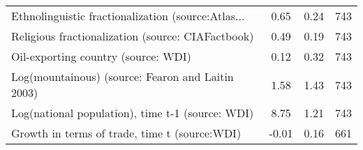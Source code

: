 \begin{table}
\begin{tabular}{lccc}
Ethnolinguistic fractionalization (source:Atlas... &    0.65 &               0.24 &          743 \\
Religious fractionalization (source: CIAFactbook)  &    0.49 &               0.19 &          743 \\
Oil-exporting country (source: WDI)                &    0.12 &               0.32 &          743 \\
Log(mountainous) (source: Fearon and Laitin 2003)  &    1.58 &               1.43 &          743 \\
Log(national population), time t-1 (source: WDI)   &    8.75 &               1.21 &          743 \\
Growth in terms of trade, time t (source:WDI)      &   -0.01 &               0.16 &          661 \\
\bottomrule
\end{tabular}
\end{table}
